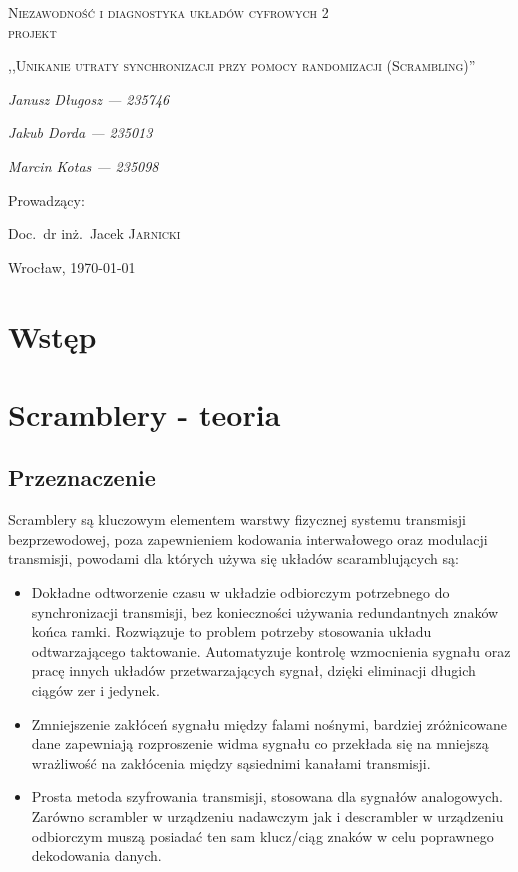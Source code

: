 \documentclass[polish, 11pt]{article}
\begin{document}
\begin{titlepage}
    \centering
    {\scshape\LARGE Niezawodność i diagnostyka układów cyfrowych 2\\ projekt \par}
    \vspace{1cm}
    {\scshape\Large,,Unikanie utraty synchronizacji przy pomocy randomizacji (Scrambling)''\par}
    \vspace{2cm}
    {\itshape\Large Janusz Długosz --- 235746\/\par}
    {\itshape\Large Jakub Dorda --- 235013\/\par}
    {\itshape\Large Marcin Kotas --- 235098\/\par}
    \vfill
    Prowadzący:\par
    Doc.~dr inż.~Jacek \textsc{Jarnicki}

    \vfill

    {\large Wrocław, \today\par}

\end{titlepage}

\tableofcontents
\newpage

\section{Wstęp}

\section{Scramblery - teoria}
    \subsection{Przeznaczenie}
	    Scramblery są kluczowym elementem warstwy fizycznej systemu transmisji bezprzewodowej, poza zapewnieniem
	    kodowania interwałowego oraz modulacji transmisji, powodami dla których używa się układów scaramblujących są:
	    \begin{itemize}
	    	\item Dokładne odtworzenie czasu w układzie odbiorczym potrzebnego do synchronizacji transmisji,
	    	bez konieczności używania redundantnych znaków końca ramki. Rozwiązuje to problem potrzeby stosowania
	    	układu odtwarzającego taktowanie. Automatyzuje kontrolę wzmocnienia sygnału oraz pracę innych układów
	    	przetwarzających sygnał, dzięki eliminacji długich ciągów zer i jedynek.
	    	\item Zmniejszenie zakłóceń sygnału między falami nośnymi, bardziej zróżnicowane dane zapewniają
	    	rozproszenie widma sygnału co przekłada się na mniejszą wrażliwość na zakłócenia między sąsiednimi
	    	kanałami transmisji.
	    	\item Prosta metoda szyfrowania transmisji, stosowana dla sygnałów analogowych. Zarówno scrambler
	    	w urządzeniu nadawczym jak i descrambler w urządzeniu odbiorczym muszą posiadać ten sam klucz/ciąg
	    	znaków w celu poprawnego dekodowania danych.
	    \end{itemize}
	    
\end{document}
